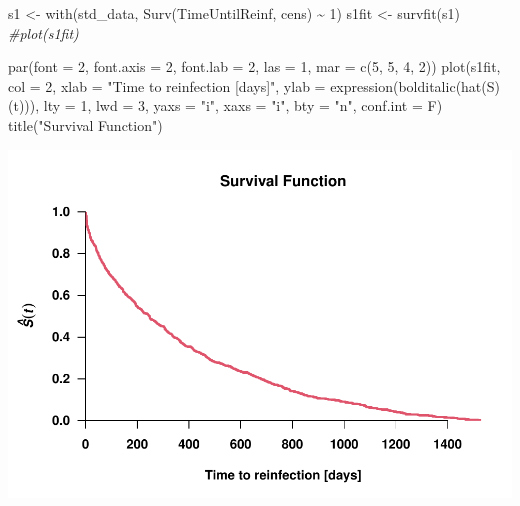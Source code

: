 \documentclass[
]{article}
\newenvironment{Shaded}{\begin{snugshade}}{\end{snugshade}}
\newcommand{\AttributeTok}[1]{\textcolor[rgb]{0.77,0.63,0.00}{#1}}
\newcommand{\CommentTok}[1]{\textcolor[rgb]{0.56,0.35,0.01}{\textit{#1}}}
\newcommand{\DecValTok}[1]{\textcolor[rgb]{0.00,0.00,0.81}{#1}}
\newcommand{\FunctionTok}[1]{\textcolor[rgb]{0.00,0.00,0.00}{#1}}
\newcommand{\NormalTok}[1]{#1}
\newcommand{\OtherTok}[1]{\textcolor[rgb]{0.56,0.35,0.01}{#1}}
\newcommand{\SpecialCharTok}[1]{\textcolor[rgb]{0.00,0.00,0.00}{#1}}
\newcommand{\StringTok}[1]{\textcolor[rgb]{0.31,0.60,0.02}{#1}}
\begin{document}
\begin{Shaded}
\begin{Highlighting}[]
\NormalTok{s1 }\OtherTok{\textless{}{-}} \FunctionTok{with}\NormalTok{(std\_data, }\FunctionTok{Surv}\NormalTok{(TimeUntilReinf, cens) }\SpecialCharTok{\textasciitilde{}} \DecValTok{1}\NormalTok{)}
\NormalTok{s1fit }\OtherTok{\textless{}{-}} \FunctionTok{survfit}\NormalTok{(s1)}
\CommentTok{\#plot(s1fit)}

\FunctionTok{par}\NormalTok{(}\AttributeTok{font =} \DecValTok{2}\NormalTok{, }\AttributeTok{font.axis =} \DecValTok{2}\NormalTok{, }\AttributeTok{font.lab =} \DecValTok{2}\NormalTok{, }\AttributeTok{las =} \DecValTok{1}\NormalTok{, }\AttributeTok{mar =} \FunctionTok{c}\NormalTok{(}\DecValTok{5}\NormalTok{, }\DecValTok{5}\NormalTok{, }\DecValTok{4}\NormalTok{, }\DecValTok{2}\NormalTok{))}
\FunctionTok{plot}\NormalTok{(s1fit, }\AttributeTok{col =} \DecValTok{2}\NormalTok{, }\AttributeTok{xlab =} \StringTok{"Time to reinfection [days]"}\NormalTok{,}
     \AttributeTok{ylab =} \FunctionTok{expression}\NormalTok{(}\FunctionTok{bolditalic}\NormalTok{(}\FunctionTok{hat}\NormalTok{(S)(t))),}
     \AttributeTok{lty =} \DecValTok{1}\NormalTok{, }\AttributeTok{lwd =} \DecValTok{3}\NormalTok{, }\AttributeTok{yaxs =} \StringTok{"i"}\NormalTok{, }\AttributeTok{xaxs =} \StringTok{"i"}\NormalTok{, }\AttributeTok{bty =} \StringTok{"n"}\NormalTok{,}
     \AttributeTok{conf.int =}\NormalTok{ F)}
\FunctionTok{title}\NormalTok{(}\StringTok{"Survival Function"}\NormalTok{)}
\end{Highlighting}
\end{Shaded}

\includegraphics{practical_files/figure-latex/unnamed-chunk-6-1.pdf}
\end{document}
